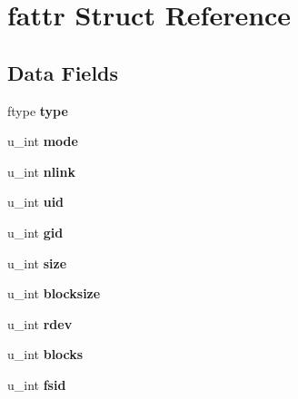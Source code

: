 \hypertarget{structfattr}{}\section{fattr Struct Reference}
\label{structfattr}
\subsection*{Data Fields}
\begin{DoxyCompactItemize}
\item 
\mbox{\label{structfattr_aa554cfc094cf2a0474d8a947566a2ada}} 
ftype {\bfseries type}
\item 
\mbox{\label{structfattr_a83cde7bd2a6baa7dd74713654c7eed8b}} 
u\+\_\+int {\bfseries mode}
\item 
\mbox{\label{structfattr_af6d2b77a2db8fec59e390b0f1fc4edf7}} 
u\+\_\+int {\bfseries nlink}
\item 
\mbox{\label{structfattr_a58c0443e55d56c185ebffe225fe3bb85}} 
u\+\_\+int {\bfseries uid}
\item 
\mbox{\label{structfattr_a08988ddeda8eb894e6d5ad915867644a}} 
u\+\_\+int {\bfseries gid}
\item 
\mbox{\label{structfattr_a6fe55df1eb763c6aa852dffa0127daeb}} 
u\+\_\+int {\bfseries size}
\item 
\mbox{\label{structfattr_ac6eb30abd6fed38fa71b14d4c13d6fdc}} 
u\+\_\+int {\bfseries blocksize}
\item 
\mbox{\label{structfattr_a348de5787295fc14348eaa5381936367}} 
u\+\_\+int {\bfseries rdev}
\item 
\mbox{\label{structfattr_ada38a3da88d4239ac35d4588120eb7cc}} 
u\+\_\+int {\bfseries blocks}
\item 
\mbox{\label{structfattr_a9380c7c61fe71157343d3ebd280b40ec}} 
u\+\_\+int {\bfseries fsid}
\item 
\mbox{\label{structfattr_a2d1d76c21c182181fcd1bd9a5d812e77}} 

\end{DoxyCompactItemize}
